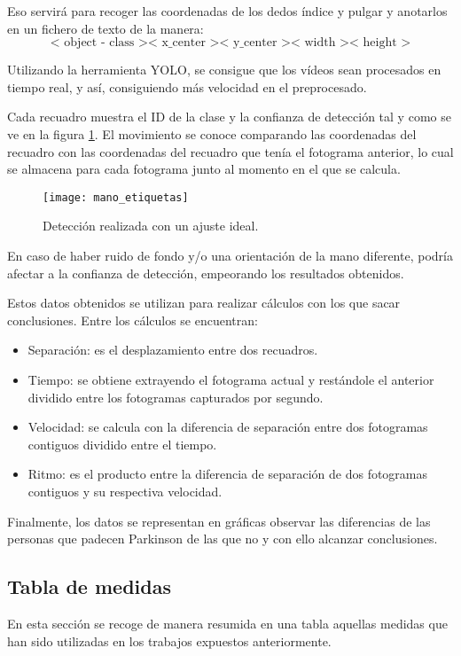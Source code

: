 Eso servirá para recoger las coordenadas de los dedos índice y pulgar y anotarlos en un fichero de texto de la manera: 
\begin{equation}
	\text{< object - class >< x\_center >< y\_center >< width >< height >}
\end{equation}

Utilizando la herramienta YOLO, se consigue que los vídeos sean procesados en tiempo real, y así, consiguiendo más velocidad en el preprocesado.

Cada recuadro muestra el ID de la clase y la confianza de detección tal y como se ve en la figura \ref{manoetiquetas}. El movimiento se conoce comparando las coordenadas del recuadro con las coordenadas del recuadro que tenía el fotograma anterior, lo cual se almacena para cada fotograma junto al momento en el que se calcula.

\begin{figure}[]
	\texttt{[image: mano\_etiquetas]}
	\caption{Detección realizada con un ajuste ideal.\cite{jaber2021proposing}}
	\label{manoetiquetas}
\end{figure}

En caso de haber ruido de fondo y/o una orientación de la mano diferente, podría afectar a la confianza de detección, empeorando los resultados obtenidos.

Estos datos obtenidos se utilizan para realizar cálculos con los que sacar conclusiones. Entre los cálculos se encuentran:

\begin{itemize}
	\item Separación: es el desplazamiento entre dos recuadros.
	\item Tiempo: se obtiene extrayendo el fotograma actual y restándole el anterior dividido entre los fotogramas capturados por segundo.
	\item Velocidad: se calcula con la diferencia de separación entre dos fotogramas contiguos dividido entre el tiempo.
	\item Ritmo: es el producto entre la diferencia de separación de dos fotogramas contiguos y su respectiva velocidad.
\end{itemize}

Finalmente, los datos se representan en gráficas observar las diferencias de las personas que padecen Parkinson de las que no y con ello alcanzar conclusiones.

\subsection{Tabla de medidas}
En esta sección se recoge de manera resumida en una tabla aquellas medidas que han sido utilizadas en los trabajos expuestos anteriormente.

